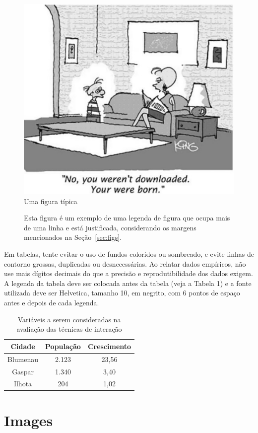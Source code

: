 \documentclass[12pt]{article}
\begin{document}
\begin{figure}[ht]
\centering
\includegraphics[width=.5\textwidth]{fig1.jpg}
\caption{Uma figura típica}
\label{fig:exampleFig1}
\end{figure}

\begin{figure}[ht]
\centering
\fbox{}
\caption{Esta figura é um exemplo de uma legenda de figura que ocupa mais de uma linha e 
está justificada, considerando os margens mencionados na Seção~\ref{sec:figs}.}
\label{fig:exampleFig2}
\end{figure}

Em tabelas, tente evitar o uso de fundos coloridos ou sombreado, e evite linhas de contorno grossas, duplicadas ou desnecessárias. Ao relatar dados empíricos, não use mais dígitos decimais do que a precisão e reprodutibilidade dos dados exigem. A legenda da tabela deve ser colocada antes da tabela (veja a Tabela 1) e a fonte utilizada deve ser Helvetica, tamanho 10, em negrito, com 6 pontos de espaço antes e depois de cada legenda.

\begin{table}[ht]
  \centering
  \caption{Variáveis a serem consideradas na avaliação das técnicas de interação}
  \label{tab:exTable1}
  \begin{tabular}{|c|c|c|}
    \hline
    \textbf{Cidade} & \textbf{População} & \textbf{Crescimento} \\
    \hline
    Blumenau & 2.123 & 23,56 \\
    Gaspar & 1.340 & 3,40 \\
    Ilhota & 204 & 1,02 \\
    \hline
  \end{tabular}
\end{table}
    
\section{Images}
\end{document}
